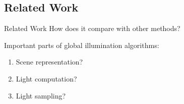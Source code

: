 \documentclass[10pt]{beamer}
\begin{document}
\subsection{Related Work}
\begin{frame}{Related Work}
  How does it compare with other methods?
  \vspace{1cm}

  Important parts of global illumination algorithms:
  \begin{enumerate}
    \item Scene representation? %
    \item Light computation? %
    \item Light sampling? %
  \end{enumerate}
\end{frame}
\end{document}

